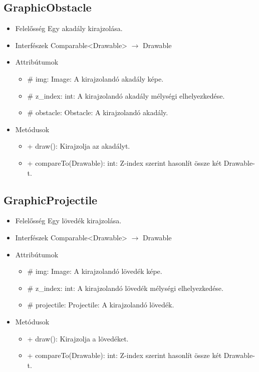 \subsection{GraphicObstacle}
\begin{itemize}
\item Felelősség\newline
Egy akadály kirajzolása.
\item Interfészek\newline
Comparable<Drawable> $\rightarrow$ Drawable
\item Attribútumok\newline
	\begin{itemize}
		\item \# img: Image: A kirajzolandó akadály képe.
		\item \# z\_index: int: A kirajzolandó akadály mélységi elhelyezkedése.
		\item \# obstacle: Obstacle: A kirajzolandó akadály.
	\end{itemize}
\item Metódusok\newline
	\begin{itemize}
		\item + draw(): Kirajzolja az akadályt.
		\item + compareTo(Drawable): int: Z-index szerint hasonlít össze két Drawable-t.
	\end{itemize}
\end{itemize}

\subsection{GraphicProjectile}
\begin{itemize}
\item Felelősség\newline
Egy lövedék kirajzolása.
\item Interfészek\newline
Comparable<Drawable> $\rightarrow$ Drawable
\item Attribútumok\newline
	\begin{itemize}
		\item \# img: Image: A kirajzolandó lövedék képe.
		\item \# z\_index: int: A kirajzolandó lövedék mélységi elhelyezkedése.
		\item \# projectile: Projectile: A kirajzolandó lövedék.
	\end{itemize}
\item Metódusok\newline
	\begin{itemize}
		\item + draw(): Kirajzolja a lövedéket.
		\item + compareTo(Drawable): int: Z-index szerint hasonlít össze két Drawable-t.
	\end{itemize}
\end{itemize}

